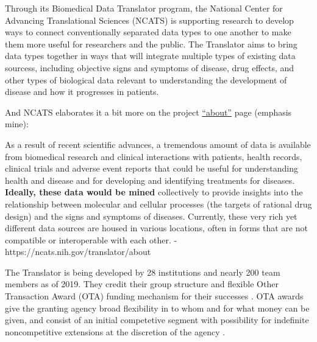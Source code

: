 \documentclass[10pt]{article}
\begin{document}
\begin{multicols}{2}
\begin{leftbar}
Through its Biomedical Data Translator program, the National Center for
Advancing Translational Sciences (NCATS) is supporting research to
develop ways to connect conventionally separated data types to one
another to make them more useful for researchers and the public. The
Translator aims to bring data types together in ways that will integrate
multiple types of existing data sourcess, including objective signs and
symptoms of disease, drug effects, and other types of biological data
relevant to understanding the development of disease and how it
progresses in patients. \cite{NIHStrategicPlan2018} 
\end{leftbar}

And NCATS elaborates it a bit more on the project
\href{https://ncats.nih.gov/translator/about}{``about''} page (emphasis
mine):

\begin{leftbar}
As a result of recent scientific advances, a tremendous amount of data
is available from biomedical research and clinical interactions with
patients, health records, clinical trials and adverse event reports that
could be useful for understanding health and disease and for developing
and identifying treatments for diseases. \textbf{Ideally, these data
would be mined} collectively to provide insights into the relationship
between molecular and cellular processes (the targets of rational drug
design) and the signs and symptoms of diseases. Currently, these very
rich yet different data sources are housed in various locations, often
in forms that are not compatible or interoperable with each other. -
https://ncats.nih.gov/translator/about
\end{leftbar}

The Translator is being developed by 28 institutions and nearly 200 team
members as of 2019. They credit their group structure and flexible Other
Transaction Award (OTA) funding mechanism for their successes \cite{consortiumBiomedicalDataTranslator2019} . OTA awards give the
granting agency broad flexibility in to whom and for what money can be
given, and consist of an initial competetive segment with possibility
for indefinite noncompetitive extensions at the discretion of the agency
\cite{fleisherOtherTransactionAward2019} .


\end{multicols}
\end{document}
